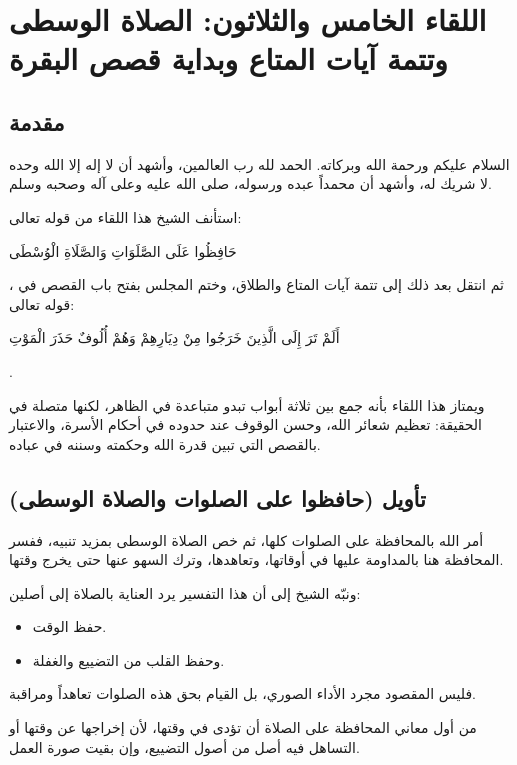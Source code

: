 \chapter{اللقاء الخامس والثلاثون: الصلاة الوسطى وتتمة آيات المتاع وبداية قصص البقرة}

\section{مقدمة}
السلام عليكم ورحمة الله وبركاته. الحمد لله رب العالمين، وأشهد أن لا إله إلا الله وحده لا شريك له، وأشهد أن محمداً عبده ورسوله، صلى الله عليه وعلى آله وصحبه وسلم.

استأنف الشيخ هذا اللقاء من قوله تعالى: \begin{ayah}حَافِظُوا عَلَى الصَّلَوَاتِ وَالصَّلَاةِ الْوُسْطَى\end{ayah}، ثم انتقل بعد ذلك إلى تتمة آيات المتاع والطلاق، وختم المجلس بفتح باب القصص في قوله تعالى: \begin{ayah}أَلَمْ تَرَ إِلَى الَّذِينَ خَرَجُوا مِنْ دِيَارِهِمْ وَهُمْ أُلُوفٌ حَذَرَ الْمَوْتِ\end{ayah}.

ويمتاز هذا اللقاء بأنه جمع بين ثلاثة أبواب تبدو متباعدة في الظاهر، لكنها متصلة في الحقيقة: تعظيم شعائر الله، وحسن الوقوف عند حدوده في أحكام الأسرة، والاعتبار بالقصص التي تبين قدرة الله وحكمته وسننه في عباده.

\separator

\section{تأويل (حافظوا على الصلوات والصلاة الوسطى)}
 أمر الله بالمحافظة على الصلوات كلها، ثم خص الصلاة الوسطى بمزيد تنبيه، ففسر  المحافظة هنا بالمداومة عليها في أوقاتها، وتعاهدها، وترك السهو عنها حتى يخرج وقتها.

ونبّه الشيخ إلى أن هذا التفسير يرد العناية بالصلاة إلى أصلين:
\begin{itemize}
    \item حفظ الوقت.
    \item وحفظ القلب من التضييع والغفلة.
\end{itemize}

فليس المقصود مجرد الأداء الصوري، بل القيام بحق هذه الصلوات تعاهداً ومراقبة.

\begin{fawaid}
من أول معاني المحافظة على الصلاة أن تؤدى في وقتها، لأن إخراجها عن وقتها أو التساهل فيه أصل من أصول التضييع، وإن بقيت صورة العمل.
\end{fawaid}

